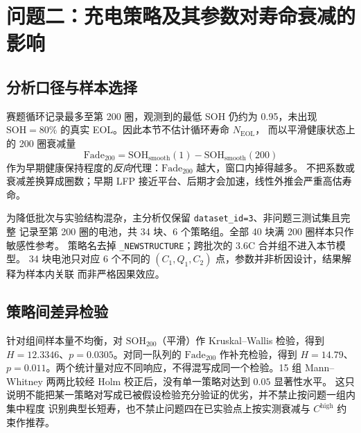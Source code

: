 \section{问题二：充电策略及其参数对寿命衰减的影响}

\subsection{分析口径与样本选择}

赛题循环记录最多至第 200 圈，观测到的最低 SOH 仍约为 0.95，未出现
\(\mathrm{SOH}=80\%\) 的真实 EOL。因此本节不估计循环寿命 \(N_{\mathrm{EOL}}\)，
而以平滑健康状态上的 200 圈衰减量
\begin{equation}
\mathrm{Fade}_{200}=\mathrm{SOH}_{\mathrm{smooth}}(1)-\mathrm{SOH}_{\mathrm{smooth}}(200)
\label{eq:q2-fade}
\end{equation}
作为早期健康保持程度的\emph{反向}代理：\(\mathrm{Fade}_{200}\) 越大，窗口内掉得越多。
不把系数或衰减差换算成圈数；早期 LFP 接近平台、后期才会加速，线性外推会严重高估寿命。

为降低批次与实验结构混杂，主分析仅保留 \texttt{dataset\_id=3}、非问题三测试集且完整
记录至第 200 圈的电池，共 34 块、6 个策略组。全部 40 块满 200 圈样本只作敏感性参考。
策略名去掉 \texttt{\_NEWSTRUCTURE}；跨批次的 \(3.6\mathrm{C}\) 合并组不进入本节模型。
34 块电池只对应 6 个不同的 \((C_1,Q_1,C_2)\) 点，参数并非析因设计，结果解释为样本内关联
而非严格因果效应。

\subsection{策略间差异检验}

针对组间样本量不均衡，对 \(\mathrm{SOH}_{200}\)（平滑）作 Kruskal--Wallis 检验，得到
\(H=12.3346\)、\(p=0.0305\)。对同一队列的 \(\mathrm{Fade}_{200}\) 作补充检验，得到
\(H=14.79\)、\(p=0.011\)。两个统计量对应不同响应，不得混写成同一个检验。15 组
Mann--Whitney 两两比较经 Holm 校正后，没有单一策略对达到 \(0.05\) 显著性水平。
这只说明不能把某一策略对写成已被假设检验充分验证的优劣，并不禁止按问题一组内集中程度
识别典型长短寿，也不禁止问题四在已实验点上按实测衰减与 \(C^{\mathrm{high}}\) 约束作推荐。

